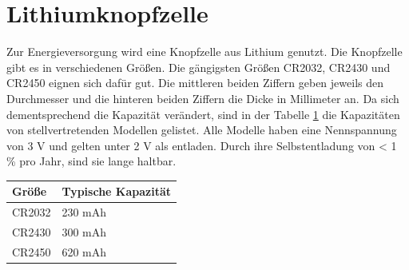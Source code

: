 \section{Lithiumknopfzelle}
Zur Energieversorgung wird eine Knopfzelle aus Lithium genutzt.
Die Knopfzelle gibt es in verschiedenen Größen.
Die gängigsten Größen CR2032, CR2430 und CR2450 eignen sich dafür gut.
Die mittleren beiden Ziffern geben jeweils den Durchmesser und die hinteren beiden Ziffern die Dicke in Millimeter an.
Da sich dementsprechend die Kapazität verändert, sind in der Tabelle \ref{tab:knopfzellen} die Kapazitäten von stellvertretenden Modellen gelistet.
Alle Modelle haben eine Nennspannung von 3 V und gelten unter 2 V als entladen.
Durch ihre Selbstentladung von < 1 \% pro Jahr, sind sie lange haltbar. \cite{datasheet_ds6450}
\begin{table}[h]
	\label{tab:knopfzellen}
	\centering
	\begin{tabular}{l|l}
		Größe & Typische Kapazität\\
		\hline
		CR2032 & 230 mAh \cite{datasheet_ds6032}\\
		CR2430 & 300 mAh \cite{datasheet_ds6430}\\
		CR2450 & 620 mAh \cite{datasheet_ds6450}\\
	\end{tabular}
\end{table}
